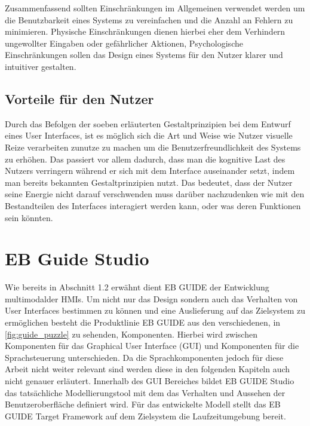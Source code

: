 Zusammenfassend sollten Einschränkungen im Allgemeinen verwendet werden um die Benutzbarkeit eines Systems zu vereinfachen und die Anzahl an Fehlern zu minimieren. Physische Einschränkungen dienen hierbei eher dem Verhindern ungewollter Eingaben oder gefährlicher Aktionen, Psychologische Einschränkungen sollen das Design eines Systems für den Nutzer klarer und intuitiver gestalten.

\subsection*{Vorteile für den Nutzer}
Durch das Befolgen der soeben erläuterten Gestaltprinzipien bei dem Entwurf eines User Interfaces, ist es möglich sich die Art und Weise wie Nutzer visuelle Reize verarbeiten zunutze zu machen um die Benutzerfreundlichkeit des Systems zu erhöhen.
Das passiert vor allem dadurch, dass man die kognitive Last des Nutzers verringern während er sich mit dem Interface auseinander setzt, indem man bereits bekannten Gestaltprinzipien nutzt.
Das bedeutet, dass der Nutzer seine Energie nicht darauf verschwenden muss darüber nachzudenken wie mit den Bestandteilen des Interfaces interagiert werden kann, oder was deren Funktionen sein könnten\cite{Knight.2019c}.

\section{EB Guide Studio}
Wie bereits in Abschnitt 1.2 erwähnt dient EB GUIDE der Entwicklung multimodalder HMIs.
Um nicht nur das Design sondern auch das Verhalten von User Interfaces bestimmen zu können und eine Auslieferung auf das Zielsystem zu ermöglichen besteht die Produktlinie EB GUIDE aus den verschiedenen, in \cref{fig:guide_puzzle} zu sehenden, Komponenten.
Hierbei wird zwischen Komponenten für das Graphical User Interface (GUI) und Komponenten für die Sprachsteuerung unterschieden.
Da die Sprachkomponenten jedoch für diese Arbeit nicht weiter relevant sind werden diese in den folgenden Kapiteln auch nicht genauer erläutert.
Innerhalb des GUI Bereiches bildet EB GUIDE Studio das tatsächliche Modellierungstool mit dem das Verhalten und Aussehen der Benutzeroberfläche definiert wird.
Für das entwickelte Modell stellt das EB GUIDE Target Framework auf dem Zielsystem die Laufzeitumgebung bereit.\cite{.c} 

